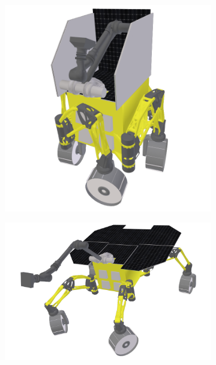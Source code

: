 \begin{figure}[h]
\captionsetup[subfigure]{justification=centering}
\vspace{-2ex}
	\centering
    \setlength{\subfigureWidth}{0.50\textwidth}
    \setlength{\graphicsHeight}{53mm}
    \hypersetup{hidelinks=true}%
    \begin{subfigure}[t]{\subfigureWidth}
        \centering
        \includegraphics[height=\graphicsHeight]{sections/power-system-design/solar-array/images/ismenius-cavus-stowed.png}
		\label{fig:sub:solar-array-on-rover-for-ismenius-cavus-stowed}
    \end{subfigure}\hfill%
    \begin{subfigure}[t]{\subfigureWidth}
        \centering
        \includegraphics[height=\graphicsHeight]{sections/power-system-design/solar-array/images/ismenius-cavus-10deg-pitch.png}

\end{subfigure}
\end{figure}
